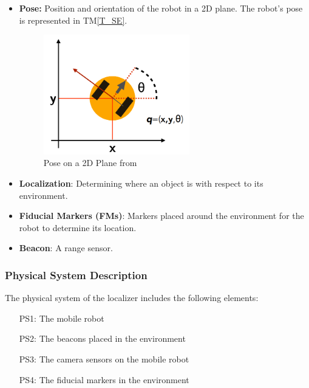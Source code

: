 \documentclass[12pt]{article}
\newcommand{\tref}[1]{TM\ref{#1}}
\begin{document}
\begin{itemize}

\item \textbf{Pose:} Position and orientation of the robot in a 2D plane. The robot's pose is represented in \tref{T_SE}.
\begin{figure}[h!]
  \begin{center}
   \includegraphics[width=0.6\textwidth]{pose.png}
  \caption{Pose on a 2D Plane from \cite{DiCaro2017}}
  \label{Fig_Pose} 
  \end{center}
\end{figure}

\item \textbf{Localization}: Determining where an object is with respect to its environment.
\item \textbf{Fiducial Markers (FMs)}: Markers placed around the environment for the robot to determine its location.
\item \textbf{Beacon}: A range sensor.

\end{itemize}

\subsubsection{Physical System Description}\label{sec_phySystDescrip}

The physical system of the localizer includes the following elements:

\begin{itemize}

\item[PS1:] The mobile robot

\item[PS2:] The beacons placed in the environment

\item[PS3:] The camera sensors on the mobile robot

\item[PS4:] The fiducial markers in the environment

\end{itemize}
\end{document}
